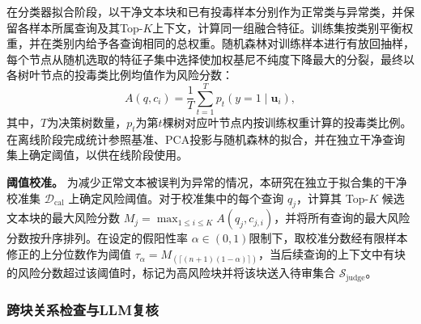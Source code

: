 在分类器拟合阶段，以干净文本块和已有投毒样本分别作为正常类与异常类，并保留各样本所属查询及其Top-$K$上下文，计算同一组融合特征。训练集按类别平衡权重，并在类别内给予各查询相同的总权重。随机森林对训练样本进行有放回抽样，每个节点从随机选取的特征子集中选择使加权基尼不纯度下降最大的分裂，最终以各树叶节点的投毒类比例均值作为风险分数：
\begin{equation}
  A(q,c_i)=\frac{1}{T}\sum_{t=1}^{T}p_t(y=1\mid\mathbf u_i),
  \label{eq:defense_risk}
\end{equation}
其中，$T$为决策树数量，$p_t$为第$t$棵树对应叶节点内按训练权重计算的投毒类比例。在离线阶段完成统计参照基准、PCA投影与随机森林的拟合，并在独立干净查询集上确定阈值，以供在线阶段使用。


\textbf{阈值校准。} 为减少正常文本被误判为异常的情况，本研究在独立于拟合集的干净校准集 $\mathcal D_{\mathrm{cal}}$ 上确定风险阈值。对于校准集中的每个查询 $q_j$，计算其 Top-$K$ 候选文本块的最大风险分数 $M_j=\max_{1\le i\le K}A(q_j,c_{j,i})$，并将所有查询的最大风险分数按升序排列。在设定的假阳性率 $\alpha\in(0,1)$限制下，取校准分数经有限样本修正的上分位数作为阈值 $\tau_\alpha=M_{(\lceil(n+1)(1-\alpha)\rceil)}$，当后续查询的上下文中有块的风险分数超过该阈值时，标记为高风险块并将该块送入待审集合 $\mathcal S_{\mathrm{judge}}$。

\subsubsection{跨块关系检查与LLM复核}

